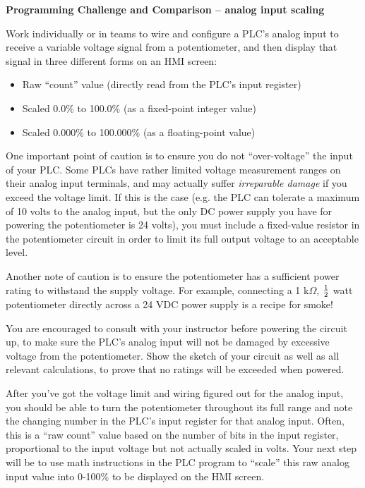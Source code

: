 

\noindent
{\bf Programming Challenge and Comparison -- analog input scaling} 

\vskip 10pt

Work individually or in teams to wire and configure a PLC's analog input to receive a variable voltage signal from a potentiometer, and then display that signal in three different forms on an HMI screen:

\begin{itemize}
\item{} Raw ``count'' value (directly read from the PLC's input register)
\item{} Scaled 0.0\% to 100.0\% (as a fixed-point integer value)
\item{} Scaled 0.000\% to 100.000\% (as a floating-point value)
\end{itemize}

\vskip 10pt

One important point of caution is to ensure you do not ``over-voltage'' the input of your PLC.  Some PLCs have rather limited voltage measurement ranges on their analog input terminals, and may actually suffer {\it irreparable damage} if you exceed the voltage limit.  If this is the case (e.g. the PLC can tolerate a maximum of 10 volts to the analog input, but the only DC power supply you have for powering the potentiometer is 24 volts), you must include a fixed-value resistor in the potentiometer circuit in order to limit its full output voltage to an acceptable level.

Another note of caution is to ensure the potentiometer has a sufficient power rating to withstand the supply voltage.  For example, connecting a 1 k$\Omega$, ${1 \over 2}$ watt potentiometer directly across a 24 VDC power supply is a recipe for smoke!

\vskip 10pt

You are encouraged to consult with your instructor before powering the circuit up, to make sure the PLC's analog input will not be damaged by excessive voltage from the potentiometer.  Show the sketch of your circuit as well as all relevant calculations, to prove that no ratings will be exceeded when powered.

\vskip 10pt

After you've got the voltage limit and wiring figured out for the analog input, you should be able to turn the potentiometer throughout its full range and note the changing number in the PLC's input register for that analog input.  Often, this is a ``raw count'' value based on the number of bits in the input register, proportional to the input voltage but not actually scaled in volts.  Your next step will be to use math instructions in the PLC program to ``scale'' this raw analog input value into 0-100\% to be displayed on the HMI screen.


